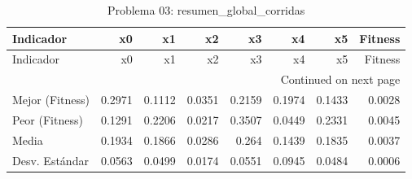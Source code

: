 \begin{longtable}{lrrrrrrr}
\caption{Problema 03: resumen\_global\_corridas}\label{tab:resumen_global_corridas} \\
\toprule
Indicador & x0 & x1 & x2 & x3 & x4 & x5 & Fitness \\
\midrule
\endfirsthead
\toprule
Indicador & x0 & x1 & x2 & x3 & x4 & x5 & Fitness \\
\midrule
\endhead
\midrule
\multicolumn{8}{r}{Continued on next page} \\
\midrule
\endfoot
\bottomrule
\endlastfoot
Mejor (Fitness) & 0.2971 & 0.1112 & 0.0351 & 0.2159 & 0.1974 & 0.1433 & 0.0028 \\
Peor (Fitness) & 0.1291 & 0.2206 & 0.0217 & 0.3507 & 0.0449 & 0.2331 & 0.0045 \\
Media & 0.1934 & 0.1866 & 0.0286 & 0.264 & 0.1439 & 0.1835 & 0.0037 \\
Desv. Estándar & 0.0563 & 0.0499 & 0.0174 & 0.0551 & 0.0945 & 0.0484 & 0.0006 \\
\end{longtable}